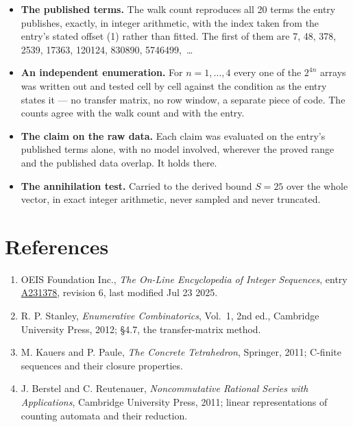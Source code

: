 \documentclass[11pt]{article}
\theoremstyle{definition}
\begin{document}
\begin{itemize}

\item {\bfseries The published terms.} The walk count reproduces all 20 terms the entry publishes, exactly, in integer arithmetic, with the index taken from the entry's stated offset (1) rather than fitted. The first of them are 7, 48, 378, 2539, 17363, 120124, 830890, 5746499,~\dots

\item {\bfseries An independent enumeration.} For $n = 1,\dots,4$ every one of the $2^{4n}$ arrays was written out and tested cell by cell against the condition as the entry states it --- no transfer matrix, no row window, a separate piece of code. The counts agree with the walk count and with the entry.

\item {\bfseries The claim on the raw data.} Each claim was evaluated on the entry's published terms alone, with no model involved, wherever the proved range and the published data overlap. It holds there.

\item {\bfseries The annihilation test.} Carried to the derived bound $S = 25$ over the whole vector, in exact integer arithmetic, never sampled and never truncated.

\end{itemize}

\section{References}

\begin{enumerate}

\item OEIS Foundation Inc., \emph{The On-Line Encyclopedia of Integer Sequences}, entry \href{https://oeis.org/A231378}{A231378}, revision 6, last modified Jul 23 2025.

\item R. P. Stanley, \emph{Enumerative Combinatorics}, Vol.~1, 2nd ed., Cambridge University Press, 2012; \S4.7, the transfer-matrix method.

\item M. Kauers and P. Paule, \emph{The Concrete Tetrahedron}, Springer, 2011; C-finite sequences and their closure properties.

\item J. Berstel and C. Reutenauer, \emph{Noncommutative Rational Series with Applications}, Cambridge University Press, 2011; linear representations of counting automata and their reduction.

\end{enumerate}
\end{document}
